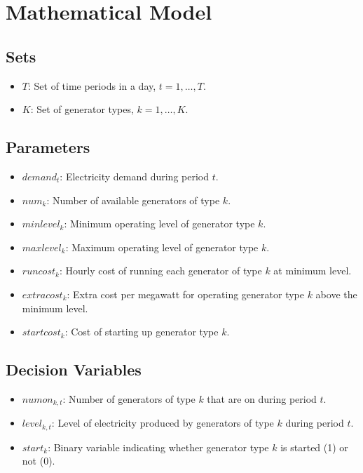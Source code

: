 \documentclass{article}
\begin{document}
\section*{Mathematical Model}

\subsection*{Sets}
\begin{itemize}
  \item $T$: Set of time periods in a day, $t = 1, \ldots, T$.
  \item $K$: Set of generator types, $k = 1, \ldots, K$.
\end{itemize}

\subsection*{Parameters}
\begin{itemize}
  \item $demand_t$: Electricity demand during period $t$.
  \item $num_k$: Number of available generators of type $k$.
  \item $minlevel_k$: Minimum operating level of generator type $k$.
  \item $maxlevel_k$: Maximum operating level of generator type $k$.
  \item $runcost_k$: Hourly cost of running each generator of type $k$ at minimum level.
  \item $extracost_k$: Extra cost per megawatt for operating generator type $k$ above the minimum level.
  \item $startcost_k$: Cost of starting up generator type $k$.
\end{itemize}

\subsection*{Decision Variables}
\begin{itemize}
  \item $numon_{k,t}$: Number of generators of type $k$ that are on during period $t$.
  \item $level_{k,t}$: Level of electricity produced by generators of type $k$ during period $t$.
  \item $start_k$: Binary variable indicating whether generator type $k$ is started (1) or not (0).
\end{itemize}
\end{document}
